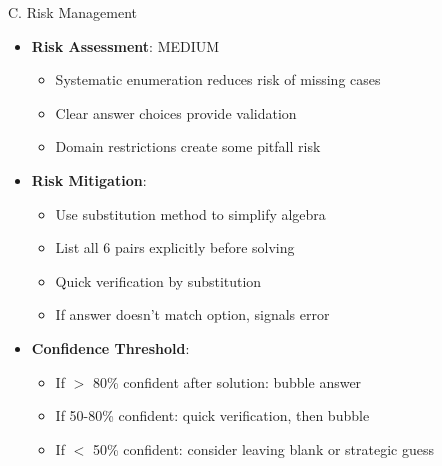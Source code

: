 \documentclass[12pt]{article}
\begin{document}
\begin{competitionbox}{C. Risk Management}
\begin{itemize}[leftmargin=*]
    \item \textbf{Risk Assessment}: MEDIUM
    \begin{itemize}
        \item Systematic enumeration reduces risk of missing cases
        \item Clear answer choices provide validation
        \item Domain restrictions create some pitfall risk
    \end{itemize}
    
    \item \textbf{Risk Mitigation}:
    \begin{itemize}
        \item Use substitution method to simplify algebra
        \item List all 6 pairs explicitly before solving
        \item Quick verification by substitution
        \item If answer doesn't match option, signals error
    \end{itemize}
    
    \item \textbf{Confidence Threshold}:
    \begin{itemize}
        \item If $>$ 80\% confident after solution: bubble answer
        \item If 50-80\% confident: quick verification, then bubble
        \item If $<$ 50\% confident: consider leaving blank or strategic guess
    \end{itemize}
\end{itemize}
\end{competitionbox}
\end{document}
